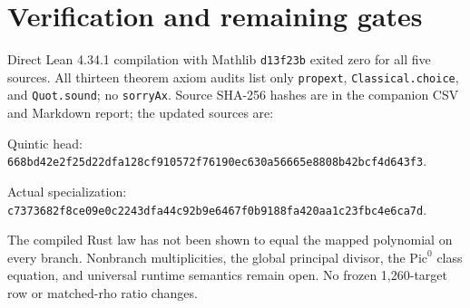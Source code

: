 \documentclass[10pt]{article}
\begin{document}
\begin{center}
\setlength{\fboxsep}{9pt}
\end{center}

\section*{Verification and remaining gates}
Direct Lean 4.34.1 compilation with Mathlib \texttt{d13f23b} exited zero for all five sources. All thirteen theorem axiom audits list only \texttt{propext}, \texttt{Classical.choice}, and \texttt{Quot.sound}; no \texttt{sorryAx}. Source SHA-256 hashes are in the companion CSV and Markdown report; the updated sources are:\par\smallskip\noindent Quintic head: {\scriptsize\texttt{668bd42e2f25d22dfa128cf910572f76190ec630a56665e8808b42bcf4d643f3}}.\par\smallskip\noindent Actual specialization: {\scriptsize\texttt{c7373682f8ce09e0c2243dfa44c92b9e6467f0b9188fa420aa1c23fbc4e6ca7d}}.

The compiled Rust law has not been shown to equal the mapped polynomial on every branch. Nonbranch multiplicities, the global principal divisor, the $\mathrm{Pic}^0$ class equation, and universal runtime semantics remain open. No frozen 1,260-target row or matched-rho ratio changes.
\end{document}
